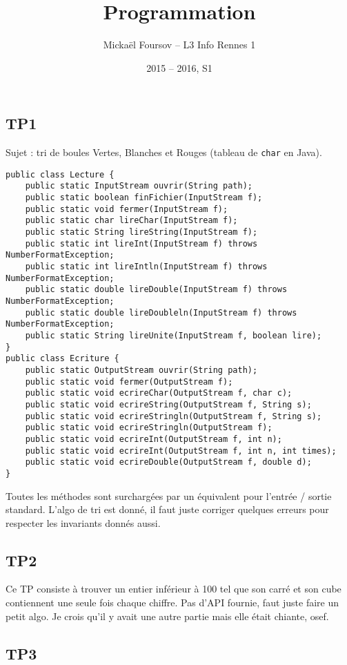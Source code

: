 \documentclass[a4paper]{article}
\title{Programmation}
\author{Mickaël Foursov -- L3 Info Rennes 1}
\date{2015 -- 2016, S1}
\begin{document}
\maketitle

\subsection*{TP1}

Sujet : tri de boules Vertes, Blanches et Rouges (tableau de \verb?char? en Java).
\begin{lstlisting}
public class Lecture {
    public static InputStream ouvrir(String path);
    public static boolean finFichier(InputStream f);
    public static void fermer(InputStream f);
    public static char lireChar(InputStream f);
    public static String lireString(InputStream f);
    public static int lireInt(InputStream f) throws NumberFormatException;
    public static int lireIntln(InputStream f) throws NumberFormatException;
    public static double lireDouble(InputStream f) throws NumberFormatException;
    public static double lireDoubleln(InputStream f) throws NumberFormatException;
    public static String lireUnite(InputStream f, boolean lire);
}
public class Ecriture {
    public static OutputStream ouvrir(String path);
    public static void fermer(OutputStream f);
    public static void ecrireChar(OutputStream f, char c);
    public static void ecrireString(OutputStream f, String s);
    public static void ecrireStringln(OutputStream f, String s);
    public static void ecrireStringln(OutputStream f);
    public static void ecrireInt(OutputStream f, int n);
    public static void ecrireInt(OutputStream f, int n, int times);
    public static void ecrireDouble(OutputStream f, double d);
}
\end{lstlisting}
Toutes les méthodes sont surchargées par un équivalent pour l'entrée / sortie standard. L'algo de tri est donné, il faut juste corriger quelques erreurs pour respecter les invariants donnés aussi.

\subsection*{TP2}

Ce TP consiste à trouver un entier inférieur à 100 tel que son carré et son cube contiennent une seule fois chaque chiffre. Pas d'API fournie, faut juste faire un petit algo. Je crois qu'il y avait une autre partie mais elle était chiante, osef.

\subsection*{TP3}
\end{document}

